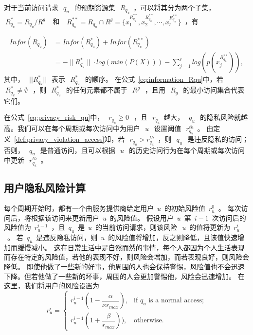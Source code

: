 对于当前访问请求~$~q_u~$~的预期资源集~$~R_{q_u}$~，可以将其分为两个子集， ~$~R_{q_u}^* = R_{q_u}/R^g~$~ 和 ~$~R_{q_u}^{**} = R_{q_u} \cap R^g = \{x_1^{R_{q_u}^{**}},x_2^{R_{q_u}^{**}},\cdots, x_r^{R_{q_u}^{**}}\}$~，有

\begin{equation}\label{eq:information_Rqu}
\begin{split}
Infor(R_{q_u})&=Infor(R_{q_u}^{*})  +Infor(R_{q_u}^{**})
\\&=-\|R_{q_u}^*\|\cdot log(min(P(X)))-\sum_{j=1}^r log(p(x_j^{R_{q_u}^{**}})),
\end{split}
\end{equation}
其中，~$~||R_{q_u}^*||~$~表示~$~R_{q_u}^*~$~的顺序。 在公式~\ref{eq:information_Rqu}中，若~$~R_{q_u}^* \neq \emptyset~$~，则~$~R_{q_u}^*~$~的任何元素都不属于~$~R^g~$~，且用~$~R_g~$~的最小访问集合代表它们。

在公式~\ref{eq:privacy_risk_qu}中，~$~r_{q_u} \geq 0~$~，且~$~r_{q_u}$~越大，~$~q_u~$~的隐私风险就越高。我们可以在每个周期或每次访问中为用户~$~u~$~设置阈值~$~r_{q_u}^{th}$~。 由定义~\ref{def:privacy_violation_access}知，若~$~r_{q_u} > r_{q_u}^{th}$~，则~$~q_u~$~是违反隐私的访问；否则，~$~q_u~$~是普通访问，且可以根据~$~u~$~的历史访问行为在每个周期或每次访问中更新~$~r_{q_u}^{th}$~。

\subsection{用户隐私风险计算}

每个周期开始时，都有一个由服务提供商给定用户~${u}$~的初始风险值~${r_u ^ 0}$~。 每次访问后，将根据该访问来更新用户~${u}$~的风险值。 假设用户~${u}$~第~${{i-1}}$~次访问后的风险值为~${r_u ^ {i-1}}$~，且~${q_u}$~是~${u}$~的当前访问请求，则该风险~$~ {u}$~的值将更新为~${r_u ^ {i}}$~。 若~${q_u}$~是违反隐私访问，则~${u}$~的风险值将增加，反之则降低，且该值快速增加而缓慢减小。 这在日常生活中是自然而然的事情，每个人都因为个人生活表现而存在特定的风险值，若他的表现不好，则风险会增加，而若表现良好，则风险会降低。 即使他做了一些新的好事，他周围的人也会保持警惕，风险值也不会迅速下降。但若他做了一些新的坏事，周围的人会更加警惕他，风险会迅速增加。 在这里，我们将用户的风险设置为
\begin{equation}\label{eq:userrisk}
r_u^{i}=\left\{ 
\begin{array}{cl}
r_u^{i-1}(1-\dfrac{\alpha}{xr_{max}}), & \text{if } q_u \text{ is a normal access;}\\
r_u^{i-1}(1+\dfrac{\beta}{r_{max}})), & \text{otherwise.}
\end{array}
\right.
\end{equation}

